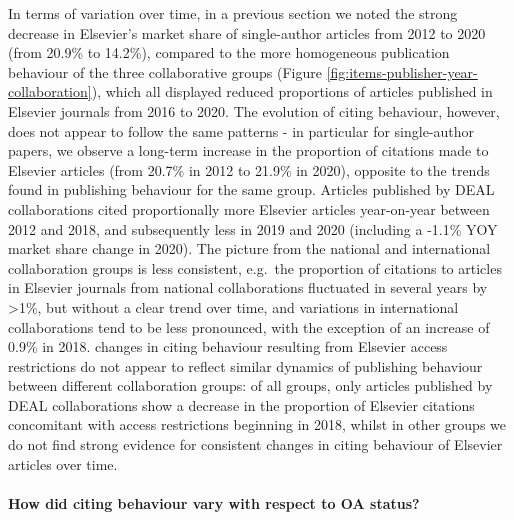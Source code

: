 \documentclass[
]{article}
\begin{document}
In terms of variation over time, in a previous section we noted the strong decrease in Elsevier's market share of single-author articles from 2012 to 2020 (from 20.9\% to 14.2\%), compared to the more homogeneous publication behaviour of the three collaborative groups (Figure \ref{fig:items-publisher-year-collaboration}), which all displayed reduced proportions of articles published in Elsevier journals from 2016 to 2020. The evolution of citing behaviour, however, does not appear to follow the same patterns - in particular for single-author papers, we observe a long-term increase in the proportion of citations made to Elsevier articles (from 20.7\% in 2012 to 21.9\% in 2020), opposite to the trends found in publishing behaviour for the same group. Articles published by DEAL collaborations cited proportionally more Elsevier articles year-on-year between 2012 and 2018, and subsequently less in 2019 and 2020 (including a -1.1\% YOY market share change in 2020). The picture from the national and international collaboration groups is less consistent, e.g.~the proportion of citations to articles in Elsevier journals from national collaborations fluctuated in several years by \textgreater1\%, but without a clear trend over time, and variations in international collaborations tend to be less pronounced, with the exception of an increase of 0.9\% in 2018. changes in citing behaviour resulting from Elsevier access restrictions do not appear to reflect similar dynamics of publishing behaviour between different collaboration groups: of all groups, only articles published by DEAL collaborations show a decrease in the proportion of Elsevier citations concomitant with access restrictions beginning in 2018, whilst in other groups we do not find strong evidence for consistent changes in citing behaviour of Elsevier articles over time.

\hypertarget{how-did-citing-behaviour-vary-with-respect-to-oa-status}{%
\paragraph{How did citing behaviour vary with respect to OA status?}\label{how-did-citing-behaviour-vary-with-respect-to-oa-status}}
\end{document}
